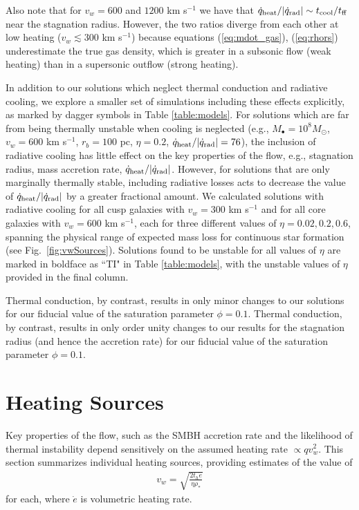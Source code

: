 \documentclass[usenatbib,fleqn]{mn2e}
\newcommand{\rhostar}{\rho_*}
\begin{document}
Also note that for $v_{w}=600$ and $1200$ km s$^{-1}$ we have that
$\dot{q}_{\rm heat}/|\dot{q}_{\rm rad}| \sim t_{\rm cool}/t_{\rm ff}$
near the stagnation radius.  However, the two ratios diverge from each
other at low heating ($v_{w} \lesssim 300$ km s$^{-1}$) because
equations (\ref{eq:mdot_gas}), (\ref{eq:rhors}) underestimate the true
gas density, which is greater in a subsonic flow (weak heating) than
in a supersonic outflow (strong heating).


In addition to our solutions which neglect thermal conduction and
radiative cooling, we explore a smaller set of simulations including
these effects explicitly, as marked by dagger symbols in Table
\ref{table:models}.  For solutions which are far from being thermally
unstable when cooling is neglected (e.g., $M_{\bullet} =
10^{8}M_{\odot}$, $v_{w} = 600$ km s$^{-1}$, $r_{b} = 100$ pc, $\eta =
0.2$, $\dot{q}_{\rm heat}/|\dot{q}_{\rm rad}| = 76$), the inclusion of
radiative cooling has little effect on the key properties of the flow,
e.g., stagnation radius, mass accretion rate, $\dot{q}_{\rm
  heat}/|\dot{q}_{\rm rad}|$.  However, for solutions that are only
marginally thermally stable, including radiative losses acts to
decrease the value of $\dot{q}_{\rm heat}/|\dot{q}_{\rm rad}|$ by a
greater fractional amount.  We calculated solutions with radiative
cooling for all cusp galaxies with $v_w=300$ km s$^{-1}$ and for all
core galaxies with $v_w=600 $ km s$^{-1}$, each for three different
values of $\eta = 0.02, 0.2, 0.6$, spanning the physical range of
expected mass loss for continuous star formation (see
Fig.~\ref{fig:vwSources}).  Solutions found to be unstable for all
values of $\eta$ are marked in boldface as ``TI" in Table
\ref{table:models}, with the unstable values of $\eta$ provided in the
final column.

Thermal conduction, by contrast, results in only minor changes to our
solutions for our fiducial value of the saturation parameter $\phi =
0.1$.  Thermal conduction, by contrast, results in only order unity
changes to our results for the stagnation radius (and hence the
accretion rate) for our fiducial value of the saturation parameter
$\phi =0.1$. 

\section{Heating Sources}
\label{sec:heating}

Key properties of the flow, such as the SMBH accretion rate and the likelihood of thermal instability depend sensitively on the assumed heating rate $\propto qv_{w}^{2}$.  This section summarizes individual heating sources, providing estimates of the value of
\begin{align}
  v_{w} = \sqrt{\frac{2 t_h \dot{e}}{\eta \rhostar}}
  \label{eq:vw_eff}
\end{align}
for each, where $\dot{e}$ is volumetric heating rate.  
\end{document}
